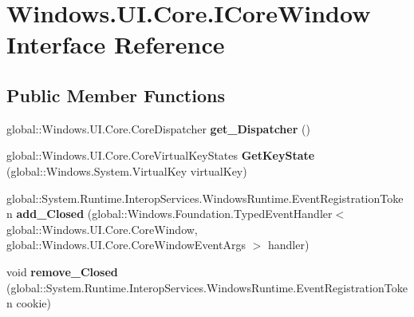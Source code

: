 \hypertarget{interface_windows_1_1_u_i_1_1_core_1_1_i_core_window}{}\section{Windows.\+U\+I.\+Core.\+I\+Core\+Window Interface Reference}
\label{interface_windows_1_1_u_i_1_1_core_1_1_i_core_window}
\subsection*{Public Member Functions}
\begin{DoxyCompactItemize}
\item 
\mbox{\label{interface_windows_1_1_u_i_1_1_core_1_1_i_core_window_a84c5feb5e529a4fd9769d23af62c0763}} 
global\+::\+Windows.\+U\+I.\+Core.\+Core\+Dispatcher {\bfseries get\+\_\+\+Dispatcher} ()
\item 
\mbox{\label{interface_windows_1_1_u_i_1_1_core_1_1_i_core_window_ac983b3644c53ef4b42a3eb558847dcb6}} 
global\+::\+Windows.\+U\+I.\+Core.\+Core\+Virtual\+Key\+States {\bfseries Get\+Key\+State} (global\+::\+Windows.\+System.\+Virtual\+Key virtual\+Key)
\item 
\mbox{\label{interface_windows_1_1_u_i_1_1_core_1_1_i_core_window_af63b2d92b72f409da0deec79fc273cde}} 
global\+::\+System.\+Runtime.\+Interop\+Services.\+Windows\+Runtime.\+Event\+Registration\+Token {\bfseries add\+\_\+\+Closed} (global\+::\+Windows.\+Foundation.\+Typed\+Event\+Handler$<$ global\+::\+Windows.\+U\+I.\+Core.\+Core\+Window, global\+::\+Windows.\+U\+I.\+Core.\+Core\+Window\+Event\+Args $>$ handler)
\item 
\mbox{\label{interface_windows_1_1_u_i_1_1_core_1_1_i_core_window_a3b1e8bcb2b7b6bc77e9940d05dcf087a}} 
void {\bfseries remove\+\_\+\+Closed} (global\+::\+System.\+Runtime.\+Interop\+Services.\+Windows\+Runtime.\+Event\+Registration\+Token cookie)
\item 
\mbox{\label{interface_windows_1_1_u_i_1_1_core_1_1_i_core_window_a6cdc5bf478aeb08105b96b21b6a7d51c}} 

\end{DoxyCompactItemize}
